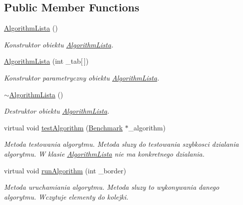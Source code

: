 \subsection*{Public Member Functions}
\begin{DoxyCompactItemize}
\item 
\hyperlink{class_algorithm_lista_a4c7749379de38154982288419f305141}{Algorithm\-Lista} ()
\begin{DoxyCompactList}\small\item\em Konstruktor obiektu \hyperlink{class_algorithm_lista}{Algorithm\-Lista}. \end{DoxyCompactList}\item 
\hyperlink{class_algorithm_lista_ab5aed5527ca4f27c213e97fa19f6e32d}{Algorithm\-Lista} (int \-\_\-tab\mbox{[}$\,$\mbox{]})
\begin{DoxyCompactList}\small\item\em Konstruktor parametryczny obiektu \hyperlink{class_algorithm_lista}{Algorithm\-Lista}. \end{DoxyCompactList}\item 
\hyperlink{class_algorithm_lista_a2d7c5ef95cdfe523a86b01da06d0fb2e}{$\sim$\-Algorithm\-Lista} ()
\begin{DoxyCompactList}\small\item\em Destruktor obiektu \hyperlink{class_algorithm_lista}{Algorithm\-Lista}. \end{DoxyCompactList}\item 
virtual void \hyperlink{class_algorithm_lista_a1e1f93e75b4a635098bf30ec32f19903}{test\-Algorithm} (\hyperlink{class_benchmark}{Benchmark} $\ast$\-\_\-algorithm)
\begin{DoxyCompactList}\small\item\em Metoda testowania algorytmu. Metoda sluzy do testowania szybkosci dzialania algorytmu. W klasie \hyperlink{class_algorithm_lista}{Algorithm\-Lista} nie ma konkretnego dzialania. \end{DoxyCompactList}\item 
virtual void \hyperlink{class_algorithm_lista_a5c41dbbd3ae7a9ac34edec1a51bc8eb1}{run\-Algorithm} (int \-\_\-border)
\begin{DoxyCompactList}\small\item\em Metoda uruchamiania algorytmu. Metoda sluzy to wykonywania danego algorytmu. Wczytuje elementy do kolejki. \end{DoxyCompactList}\end{DoxyCompactItemize}
